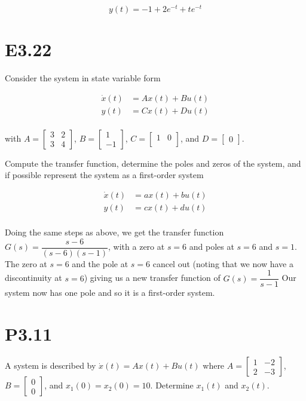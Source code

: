 \documentclass[11pt]{article}
\begin{document}
\[ y(t) = -1 + 2e^{-t} + te^{-t} \]

\section{E3.22}

Consider the system in state variable form

\begin{align*}
    \dot x(t) &= Ax(t) + Bu(t) \\
    y(t) &= Cx(t) + Du(t) \\
\end{align*}

with $A = \begin{bmatrix} 3 & 2 \\ 3 & 4 \end{bmatrix}$, $B = \begin{bmatrix} 1 \\ -1 \end{bmatrix}$, $C = \begin{bmatrix} 1 & 0 \\ \end{bmatrix}$, and $D = \begin{bmatrix} 0 \end{bmatrix}$.

Compute the transfer function, determine the poles and zeros of the system, and if possible represent the system as a first-order system

\begin{align*}
    \dot x(t) &= ax(t) + bu(t) \\
    y(t) &= cx(t) + du(t) \\
\end{align*}

Doing the same steps as above, we get the transfer function $G(s) = \dfrac{s - 6}{(s - 6)(s - 1)}$, with a zero at $s = 6$ and poles at $s = 6$ and $s = 1$. The zero at $s = 6$ and the pole at $s = 6$ cancel out (noting that we now have a discontinuity at $s = 6$) giving us a new transfer function of $G(s) = \dfrac{1}{s - 1}$ Our system now has one pole and so it is a first-order system.

\section{P3.11}

A system is described by $\dot x(t) = Ax(t) + Bu(t)$ where $A = \begin{bmatrix} 1 & -2 \\ 2 & -3 \end{bmatrix}$, $B = \begin{bmatrix} 0 \\ 0 \end{bmatrix}$, and $x_1(0) = x_2(0) = 10$. Determine $x_1(t)$ and $x_2(t)$.
\end{document}
